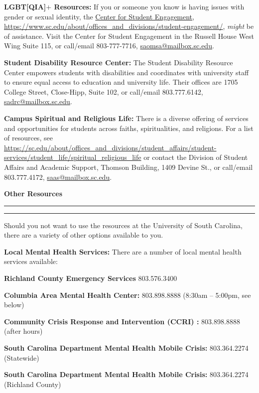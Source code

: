 \documentclass[11pt,letterpaper]{article}
\newcommand{\mysection}[2]{%
\begin{minipage}{\textwidth}
\phantomsection
	{%
\large\bfseries\color{scred}
#2 \par\vspace{-0.62\baselineskip}
\noindent\rule{#1\textwidth}{1.5pt} \par
\vspace{-0.3cm}\noindent\rule{0.13\textwidth}{5.1pt}%
	}%
\end{minipage}\par\vspace{4\lineskip}%
}
\newcommand{\colortext}[1]{{\bfseries\color{scred}#1}}
\newcommand{\ptspace}{\par\vspace{0.50\baselineskip}}
\newcommand{\pttspace}{\par\vspace{0.50\baselineskip}}
\newcommand{\pspecial}{\par\vspace{0.50\baselineskip}}
\begin{document}
{\colortext{LGBT[QIA]$+$ Resources:} If you or someone you know is having issues with gender or sexual identity, the \href{https://www.sc.edu/about/offices\_and\_divisions/student-engagement/}{Center for Student Engagement}, \href{https://www.sc.edu/about/offices\_and\_divisions/student-engagement/}{https://www.sc.edu/about/offices\_and\_divisions/student-engagement/}, \textit{might} be of assistance. Visit the Center for Student Engagement in the Russell House West Wing Suite 115, or call/email 803-777-7716, \href{mailto:saomsa@mailbox.sc.edu}{saomsa@mailbox.sc.edu}. \pspecial

\colortext{Student Disability Resource Center:} The Student Disability Resource Center empowers students with disabilities and coordinates with university staff to ensure equal access to education and university life. Their offices are 1705 College Street, Close-Hipp, Suite 102, or call/email 803.777.6142, \href{mailto:sadrc@mailbox.sc.edu}{sadrc@mailbox.sc.edu}. \pspecial

\colortext{Campus Spiritual and Religious Life:} There is a diverse offering of services and opportunities for students across faiths, spiritualities, and religions. For a list of resources, see \url{https://sc.edu/about/offices\_and\_divisions/student\_affairs/student-services/student\_life/spiritual\_religious\_life} or contact the Division of Student Affairs and Academic Support, Thomson Building, 1409 Devine St., or call/email 803.777.4172, \href{mailto:saas@mailbox.sc.edu}{saas@mailbox.sc.edu}. \vfill

\mysection{0.30}{Other Resources}

Should you not want to use the resources at the University of South Carolina, there are a variety of other options available to you. \pttspace

\colortext{Local Mental Health Services:} There are a number of local mental health services available: \ptspace
	\hspace{0.2cm} {\bfseries Richland County Emergency Services} 803.576.3400 \par
	\hspace{0.2cm} {\bfseries Columbia Area Mental Health Center:} 803.898.8888 (8:30am -- 5:00pm, see below) \par
	\hspace{0.2cm} {\bfseries Community Crisis Response and Intervention (CCRI) :} 803.898.8888 (after hours) \par
	\hspace{0.2cm} {\bfseries South Carolina Department Mental Health Mobile Crisis:} 803.364.2274 (Statewide) \par
	\hspace{0.2cm} {\bfseries South Carolina Department Mental Health Mobile Crisis:} 803.364.2274 (Richland County) \pspecial

}
\end{document}
